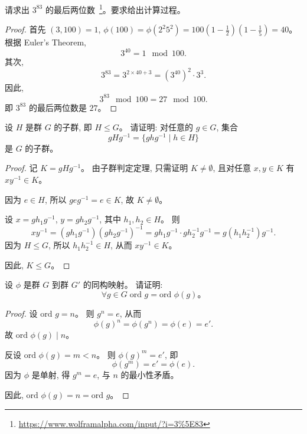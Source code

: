 \documentclass[a4paper, justified]{tufte-handout}
\begin{document}
\begin{problem}
  请求出 $3^{83}$ 的最后两位数~\footnote{\url{https://www.wolframalpha.com/input/?i=3\%5E83}}。要求给出计算过程。
\end{problem}

\begin{proof}
  首先 $(3, 100) = 1$, $\phi(100) = \phi(2^2 5^2) = 100 (1 - \frac{1}{2})(1 - \frac{1}{5}) = 40$。
  根据 Euler's Theorem,
  \[
    3^{40} = 1 \mod{100}.
  \]
  其次,
  \[
    3^{83} = 3^{2 \times 40 + 3} = (3^{40})^{2} \cdot 3^{3}.
  \]
  因此,
  \[
    3^{83} \mod{100} = 27 \mod{100}.
  \]
  即 $3^{83}$ 的最后两位数是 $27$。
\end{proof}

\begin{problem}
  设 $H$ 是群 $G$ 的子群, 即 $H \le G$。
  请证明: 对任意的 $g \in G$, 集合
  \[
    gHg^{-1} = \{ghg^{-1} \mid h \in H\}
  \]
  是 $G$ 的子群。
\end{problem}

\begin{proof}
  记 $K = gHg^{-1}$。
  由子群判定定理, 只需证明 $K \neq \emptyset$, 且对任意 $x, y \in K$ 有 $xy^{-1} \in K$。

  因为 $e \in H$, 所以 $g e g^{-1} = e \in K$, 故 $K \neq \emptyset$。

  设 $x = gh_1g^{-1}$, $y = gh_2g^{-1}$, 其中 $h_1, h_2 \in H$。
  则
  \[
    xy^{-1}
    = (gh_1g^{-1})(gh_2g^{-1})^{-1}
    = gh_1g^{-1} \cdot g h_2^{-1} g^{-1}
    = g(h_1 h_2^{-1})g^{-1}.
  \]
  因为 $H \le G$, 所以 $h_1 h_2^{-1} \in H$, 从而 $xy^{-1} \in K$。

  因此, $K \le G$。
\end{proof}

\begin{problem}
  设 $\phi$ 是群 $G$ 到群 $G'$ 的同构映射。
  请证明:
  \[
    \forall g \in G\; \text{ord } g = \text{ord } \phi(g)\text{。}
  \]
\end{problem}

\begin{proof}
  设 $\text{ord } g = n$。
  则 $g^n = e$, 从而
  \[
    \phi(g)^n = \phi(g^n) = \phi(e) = e'.
  \]
  故 $\text{ord } \phi(g) \mid n$。

  反设 $\text{ord } \phi(g) = m < n$。
  则 $\phi(g)^m = e'$, 即
  \[
    \phi(g^m) = e' = \phi(e).
  \]
  因为 $\phi$ 是单射, 得 $g^m = e$, 与 $n$ 的最小性矛盾。

  因此, $\text{ord } \phi(g) = n = \text{ord } g$。
\end{proof}
\end{document}
